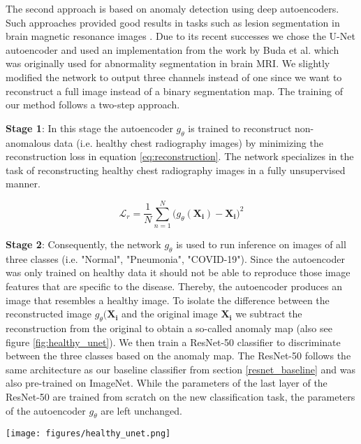 \documentclass[conference]{IEEEtran}
\begin{document}
The second approach is based on anomaly detection using deep autoencoders. Such approaches provided good results in tasks such as lesion segmentation in brain magnetic resonance images \cite{Baur_2019}. Due to its recent successes we chose the U-Net \cite{ronneberger2015unet} autoencoder and used an implementation from the work by Buda et al. \cite{buda2019association} which was originally used for abnormality segmentation in brain MRI. We slightly modified the network to output three channels instead of one since we want to reconstruct a full image instead of a binary segmentation map. The training of our method follows a two-step approach.

\textbf{Stage 1}: In this stage the autoencoder $g_\theta$ is trained to reconstruct non-anomalous data (i.e. healthy chest radiography images) by minimizing the reconstruction loss in equation \ref{eq:reconstruction}. The network specializes in the task of reconstructing healthy chest radiography images in a fully unsupervised manner. 

\begin{equation}
	\mathcal{L}_{r} = \frac{1}{N} \sum_{n=1}^{N}\big(g_\theta(\mathbf{X_i})- \mathbf{X_i}\big)^2
	\label{eq:reconstruction}
\end{equation}

\textbf{Stage 2}: Consequently, the network $g_\theta$ is used to run inference on images of all three classes (i.e. "Normal", "Pneumonia", "COVID-19"). Since the autoencoder was only trained on healthy data it should not be able to reproduce those image features that are specific to the disease. Thereby, the autoencoder produces an image that resembles a healthy image. To isolate the difference between the reconstructed image $g_\theta(\mathbf{X_i}$ and the original image $\mathbf{X_i}$ we subtract the reconstruction from the original to obtain a so-called anomaly map (also see figure \ref{fig:healthy_unet}). We then train a ResNet-50 classifier to discriminate between the three classes based on the anomaly map. The ResNet-50 follows the same architecture as our baseline classifier from section \ref{resnet_baseline} and was also pre-trained on ImageNet. While the parameters of the last layer of the ResNet-50 are trained from scratch on the new classification task, the parameters of the autoencoder $g_\theta$ are left unchanged.

\begin{figure*}
	\centering
	\texttt{[image: figures/healthy\_unet.png]}
	\caption{Architecture of Anomaly Detector}
	\label{fig:healthy_unet}
\end{figure*}
\end{document}
